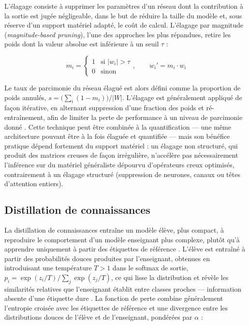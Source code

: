 L'élagage consiste à supprimer les paramètres d'un réseau dont la contribution à la sortie est jugée négligeable, dans le but de réduire la taille du modèle et, sous réserve d'un support matériel adapté, le coût de calcul. L'élagage par magnitude (\textit{magnitude-based pruning}), l'une des approches les plus répandues, retire les poids dont la valeur absolue est inférieure à un seuil $\tau$ \cite{han2015learning} :

\begin{equation}
    m_i =
    \begin{cases}
        1 & \text{si } |w_i| > \tau \\
        0 & \text{sinon}
    \end{cases}
    , \qquad w_i' = m_i \cdot w_i
\end{equation}

Le taux de parcimonie du réseau élagué est alors défini comme la proportion de poids annulés, $s = \big(\sum_i (1 - m_i)\big) / |W|$. L'élagage est généralement appliqué de façon itérative, en alternant suppression d'une fraction des poids et ré-entraînement, afin de limiter la perte de performance à un niveau de parcimonie donné \cite{han2015learning}.
Cette technique peut être combinée à la quantification --- une même architecture pouvant être à la fois élaguée et quantifiée \cite{han2016deepcompression} --- mais son bénéfice pratique dépend fortement du support matériel : un élagage non structuré, qui produit des matrices creuses de façon irrégulière, n'accélère pas nécessairement l'inférence sur du matériel généraliste dépourvu d'opérateurs creux optimisés, contrairement à un élagage structuré (suppression de neurones, canaux ou têtes d'attention entiers).

\subsection{Distillation de connaissances}
\label{sec:distillation}

La distillation de connaissances entraîne un modèle élève, plus compact, à
reproduire le comportement d'un modèle enseignant plus complexe, plutôt qu'à apprendre uniquement à partir des étiquettes de référence \cite{hinton2015distilling}.
L'élève est entraîné à partir des probabilités \og douces \fg{} produites par l'enseignant, obtenues en introduisant une température $T > 1$ dans le softmax de sortie, $p_i = \exp(z_i/T) / \sum_j \exp(z_j/T)$, ce qui lisse la distribution et révèle les similarités relatives que l'enseignant établit entre classes proches --- information absente d'une étiquette \og dure \fg{}.
La fonction de perte combine généralement l'entropie croisée avec les étiquettes de référence et une divergence entre les distributions douces de l'élève et de l'enseignant, pondérées par $\alpha$ :

